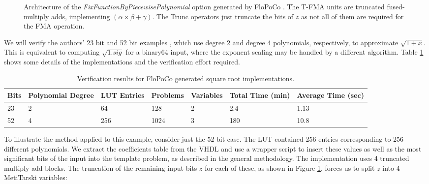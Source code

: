 \documentclass{fac}
\begin{document}
\begin{figure}
\centering

\caption{Architecture of the \textit{FixFunctionByPiecewisePolynomial} option generated by FloPoCo \cite{DinJolPas2010-poly}. The T-FMA units are truncated fused-multiply adds, implementing $(\alpha\times \beta + \gamma)$. The Trunc operators just truncate the bits of $z$ as not all of them are required for the FMA operation.\label{horner_arch}}
\end{figure}

We will verify the authors' 23 bit and 52 bit examples  \cite{DinJolPas2010-poly}, which use degree 2 and degree 4 polynomials, respectively, to approximate $\sqrt{1+x}$. This is equivalent to computing $\sqrt{1.sig}$ for a binary64 input, where the exponent scaling may be handled by a different algorithm. Table \ref{flopo_results} shows some details of the implementations and the verification effort required. 
\begin{center}
\begin{table}
\begin{tabular}{lllllll}
\toprule
Bits & Polynomial Degree & LUT Entries & Problems & Variables & Total Time (min) & Average Time (sec)\\
\midrule
23 & 2 & 64 & 128 & 2 & 2.4 & 1.13 \\
52 & 4 & 256 & 1024 & 3 & 180 & 10.8\\
\bottomrule
\end{tabular}	
\caption{Verification results for FloPoCo generated square root implementations.}\label{flopo_results}     
\end{table}
\end{center}
To illustrate the method applied to this example, consider just the 52 bit case. The LUT contained 256 entries corresponding to 256 different polynomials. We extract the coefficients table from the VHDL and use a wrapper script to insert these values as well as the most significant bits of the input into the template problem, as described in the general methodology. The implementation uses 4 truncated multiply add blocks. The truncation of the remaining input bits $z$ for each of these, as shown in Figure \ref{horner_arch}, forces us to split $z$ into 4 MetiTarski variables:
\begin{center}
\end{center}
\end{document}
